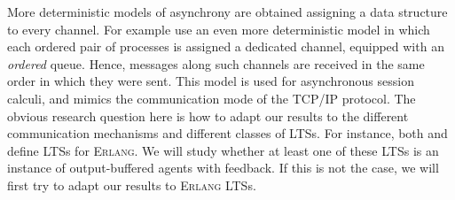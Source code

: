 More deterministic models of asynchrony are obtained assigning a data
structure to every channel. %
%
For example \cite{HYC08,HYC16} use an even more deterministic model
in which each ordered pair of processes is assigned a dedicated
channel, equipped with an {\em ordered} queue. Hence, messages along
such channels are received in the same order in which they were sent.
  This model is used for asynchronous session calculi, and mimics the
  communication mode of the TCP/IP protocol.  The obvious research
  question here is how to adapt our results to the different
  communication mechanisms and different classes of LTSs. For
  instance, both \cite{Tanti2015TowardsSR} and \cite{caruana19}
  define LTSs for \textsc{Erlang}. We will study whether at least one
  of these LTSs is an instance of output-buffered agents with
  feedback. If this is not the case, we will first try to adapt our
  results to \textsc{Erlang} LTSs.


